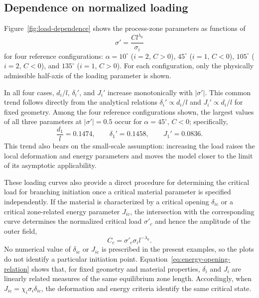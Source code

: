 \subsection{Dependence on normalized loading}
\label{subsec:figure2}

Figure~\ref{fig:load-dependence} shows the process-zone parameters as
functions of
\begin{equation*}
  \sigma'=\frac{Cl^{\lambda_0}}{\sigma_i}
\end{equation*}
for four reference configurations:
$\alpha=10^\circ$ ($i=2$, $C>0$),
$45^\circ$ ($i=1$, $C<0$),
$105^\circ$ ($i=2$, $C<0$), and
$135^\circ$ ($i=1$, $C>0$). For each configuration, only the physically
admissible half-axis of the loading parameter is shown.


In all four cases, $d_i/l$, $\delta_i'$, and $J_i'$ increase
monotonically with $|\sigma'|$. This common trend follows directly from
the analytical relations
$\delta_i'\propto d_i/l$ and $J_i'\propto d_i/l$ for fixed geometry.
Among the four reference configurations shown, the largest values of all
three parameters at $|\sigma'|=0.5$ occur for
$\alpha=45^\circ$, $C<0$; specifically,
\begin{equation*}
  \frac{d_1}{l}=0.1474,\qquad
  \delta_1'=0.1458,\qquad
  J_1'=0.0836.
\end{equation*}
This trend also bears on the small-scale assumption: increasing the load
raises the local deformation and energy parameters and moves the model
closer to the limit of its asymptotic applicability.

These loading curves also provide a direct procedure for determining
the critical load for branching initiation once a critical material
parameter is specified independently. If the material is characterized by
a critical opening $\delta_{i\mathrm{c}}$ or a critical zone-related
energy parameter $J_{i\mathrm{c}}$, the intersection with the
corresponding curve determines the normalized critical load $\sigma'_c$
and hence the amplitude of the outer field,
\begin{equation*}
  C_c=\sigma'_c\sigma_i l^{-\lambda_0}.
\end{equation*}
No numerical value of $\delta_{i\mathrm{c}}$ or $J_{i\mathrm{c}}$ is
prescribed in the present examples, so the plots do not identify a
particular initiation point. Equation~\eqref{eq:energy-opening-relation}
shows that, for fixed geometry and material properties, $\delta_i$ and
$J_i$ are linearly related measures of the same equilibrium zone length.
Accordingly, when
$J_{i\mathrm{c}}=\chi_i\sigma_i\delta_{i\mathrm{c}}$, the
deformation and energy criteria identify the same critical state.

